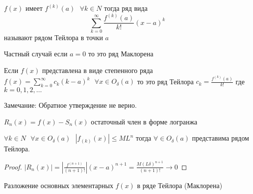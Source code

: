 \begin{define}
  $f(x)$ имеет $f^{(k)}(a) ~~~ \forall k \in N$ тогда ряд вида
  $$
  \sum_{k=0}^{\infty} \frac{f^{(k)}(a)}{k!} (x-a)^k
  $$
  называют рядом Тейлора в точки $a$

  Частный случай если $a = 0$ то это ряд Маклорена
\end{define}

\begin{theorem}
  Если $f(x)$ представлена в виде степенного ряда $f(x) = \sum_{k=0}^{\infty}
  c_k(k-a)^k ~~~ \forall x \in O_{\delta}(a)$ то это ряд Тейлора
  $c_k = \frac{f^{(k)}(a)}{k!}$ где $k = 0,1,2, \ldots$
\end{theorem}

Замечание: Обратное утверждение не верно.

\begin{define}
  $R_n(x) = f(x) - S_n(x)$ остаточный член в форме логранжа
\end{define}

\begin{theorem}
  $\forall k \in N ~~~ \forall x \in O_{\delta}(a) ~~~ |f_{(k)}(x)| \le M L^n$
  тогда $\forall \in O_{\delta}(a)$ представима рядом Тейлора.
\end{theorem}

\begin{proof}
  $|R_n(x)| = \left| \frac{f^{(n+1)}}{(n+1)!} \right| (x-a)^{n+1} =
  \frac{ M (L\delta)^{n+1} }{(n+1)!} \to 0$
\end{proof}

\begin{title}
  Разложение основных элементарных $f(x)$ в ряде Тейлора (Маклорена)
\end{title}